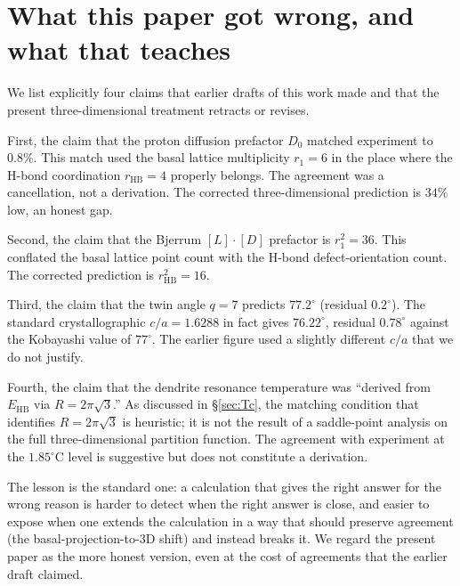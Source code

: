 \documentclass[final]{siamltex}
\begin{document}
\section{What this paper got wrong, and what that teaches}
\label{sec:lessons}

We list explicitly four claims that earlier drafts of this work
made and that the present three-dimensional treatment retracts or
revises.

First, the claim that the proton diffusion prefactor $D_0$ matched
experiment to $0.8\%$.  This match used the basal lattice
multiplicity $r_1 = 6$ in the place where the H-bond coordination
$r_{\mathrm{HB}} = 4$ properly belongs.  The agreement was a
cancellation, not a derivation.  The corrected three-dimensional
prediction is $34\%$ low, an honest gap.

Second, the claim that the Bjerrum $[L]\!\cdot\![D]$ prefactor is
$r_1^2 = 36$.  This conflated the basal lattice point count with
the H-bond defect-orientation count.  The corrected prediction is
$r_{\mathrm{HB}}^2 = 16$.

Third, the claim that the twin angle $q = 7$ predicts
$77.2^{\circ}$ (residual $0.2^{\circ}$).  The standard
crystallographic $c/a = 1.6288$ in fact gives $76.22^{\circ}$,
residual $0.78^{\circ}$ against the Kobayashi value of
$77^{\circ}$.  The earlier figure used a slightly different $c/a$
that we do not justify.

Fourth, the claim that the dendrite resonance temperature was
``derived from $E_{\mathrm{HB}}$ via $R = 2\pi\sqrt{3}$.''  As
discussed in \S\ref{sec:Tc}, the matching condition that
identifies $R = 2\pi\sqrt{3}$ is heuristic; it is not the result
of a saddle-point analysis on the full three-dimensional partition
function.  The agreement with experiment at the $1.85^{\circ}$C
level is suggestive but does not constitute a derivation.

The lesson is the standard one: a calculation that gives the
right answer for the wrong reason is harder to detect when the
right answer is close, and easier to expose when one extends the
calculation in a way that should preserve agreement (the
basal-projection-to-3D shift) and instead breaks it.  We regard
the present paper as the more honest version, even at the cost
of agreements that the earlier draft claimed.

\end{document}
